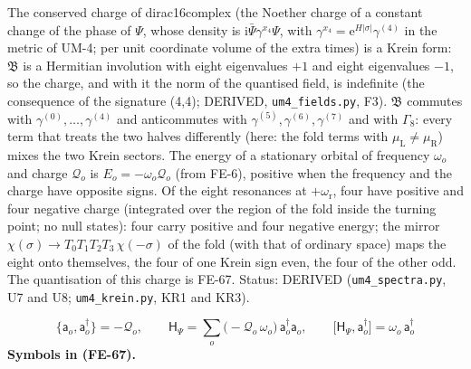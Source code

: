 \documentclass[
  10pt,
]{article}
\begin{document}
The conserved charge of dirac16complex (the Noether charge of a constant
change of the phase of \(\Psi\), whose density is
\(\mathrm{i}\bar\Psi\gamma^{x_4}\Psi\), with
\(\gamma^{x_4} = \mathrm{e}^{H\lvert\sigma\rvert}\gamma^{(4)}\) in the
metric of UM-4; per unit coordinate volume of the extra times) is a
Krein form: \(\mathfrak{B}\) is a Hermitian involution with eight
eigenvalues \(+1\) and eight eigenvalues \(-1\), so the charge, and with
it the norm of the quantised field, is indefinite (the consequence of
the signature (4,4); DERIVED, \texttt{um4\_fields.py}, F3).
\(\mathfrak{B}\) commutes with \(\gamma^{(0)}, \dots, \gamma^{(4)}\) and
anticommutes with \(\gamma^{(5)}, \gamma^{(6)}, \gamma^{(7)}\) and with
\(\Gamma_8\): every term that treats the two halves differently (here:
the fold terms with \(\mu_{\mathrm{L}} \ne \mu_{\mathrm{R}}\)) mixes the
two Krein sectors. The energy of a stationary orbital of frequency
\(\omega_o\) and charge \(\mathcal{Q}_o\) is
\(E_o = -\omega_o\mathcal{Q}_o\) (from FE-6), positive when the
frequency and the charge have opposite signs. Of the eight resonances at
\(+\omega_{\mathrm{r}}\), four have positive and four negative charge
(integrated over the region of the fold inside the turning point; no
null states): four carry positive and four negative energy; the mirror
\(\chi(\sigma) \to T_0T_1T_2T_3\,\chi(-\sigma)\) of the fold (with that
of ordinary space) maps the eight onto themselves, the four of one Krein
sign even, the four of the other odd. The quantisation of this charge is
FE-67. Status: DERIVED (\texttt{um4\_spectra.py}, U7 and U8;
\texttt{um4\_krein.py}, KR1 and KR3).

\[
\big\{\mathsf{a}_o, \mathsf{a}_o^\dagger\big\} = -\mathcal{Q}_o,\qquad
\mathsf{H}_\Psi = \sum_o\big(-\mathcal{Q}_o\,\omega_o\big)\,\mathsf{a}_o^\dagger\mathsf{a}_o,\qquad
\big[\mathsf{H}_\Psi, \mathsf{a}_o^\dagger\big] = \omega_o\,\mathsf{a}_o^\dagger \tag{FE-67}
\] \textbf{Symbols in (FE-67).}
\end{document}

